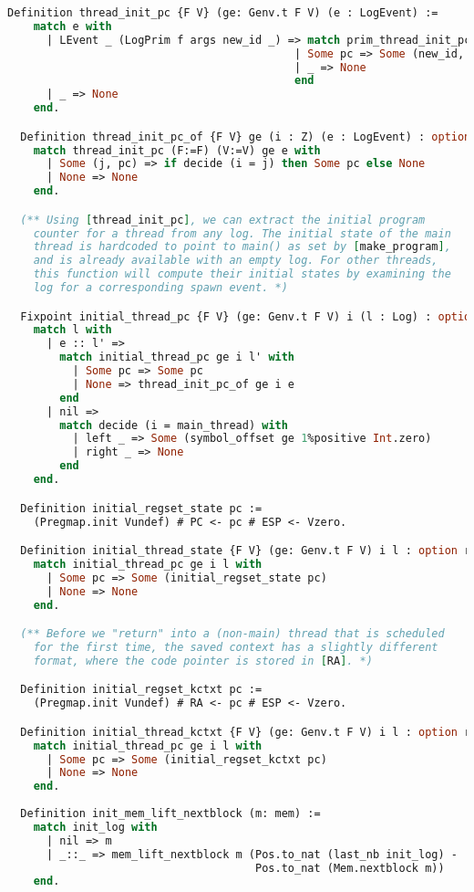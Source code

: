 \begin{lstlisting}[language=Caml]
  Definition thread_init_pc {F V} (ge: Genv.t F V) (e : LogEvent) :=
    match e with
      | LEvent _ (LogPrim f args new_id _) => match prim_thread_init_pc ge f args with 
                                            | Some pc => Some (new_id, pc)
                                            | _ => None
                                            end
      | _ => None
    end.

  Definition thread_init_pc_of {F V} ge (i : Z) (e : LogEvent) : option val :=
    match thread_init_pc (F:=F) (V:=V) ge e with
      | Some (j, pc) => if decide (i = j) then Some pc else None
      | None => None
    end.

  (** Using [thread_init_pc], we can extract the initial program
    counter for a thread from any log. The initial state of the main
    thread is hardcoded to point to main() as set by [make_program],
    and is already available with an empty log. For other threads,
    this function will compute their initial states by examining the
    log for a corresponding spawn event. *)

  Fixpoint initial_thread_pc {F V} (ge: Genv.t F V) i (l : Log) : option val :=
    match l with
      | e :: l' =>
        match initial_thread_pc ge i l' with
          | Some pc => Some pc
          | None => thread_init_pc_of ge i e
        end
      | nil =>
        match decide (i = main_thread) with
          | left _ => Some (symbol_offset ge 1%positive Int.zero)
          | right _ => None
        end
    end.

  Definition initial_regset_state pc :=
    (Pregmap.init Vundef) # PC <- pc # ESP <- Vzero.

  Definition initial_thread_state {F V} (ge: Genv.t F V) i l : option regset :=
    match initial_thread_pc ge i l with
      | Some pc => Some (initial_regset_state pc)
      | None => None
    end.

  (** Before we "return" into a (non-main) thread that is scheduled
    for the first time, the saved context has a slightly different
    format, where the code pointer is stored in [RA]. *)

  Definition initial_regset_kctxt pc :=
    (Pregmap.init Vundef) # RA <- pc # ESP <- Vzero.

  Definition initial_thread_kctxt {F V} (ge: Genv.t F V) i l : option regset :=
    match initial_thread_pc ge i l with
      | Some pc => Some (initial_regset_kctxt pc)
      | None => None
    end.
    
  Definition init_mem_lift_nextblock (m: mem) :=
    match init_log with
      | nil => m
      | _::_ => mem_lift_nextblock m (Pos.to_nat (last_nb init_log) -
                                      Pos.to_nat (Mem.nextblock m))
    end.

\end{lstlisting}

